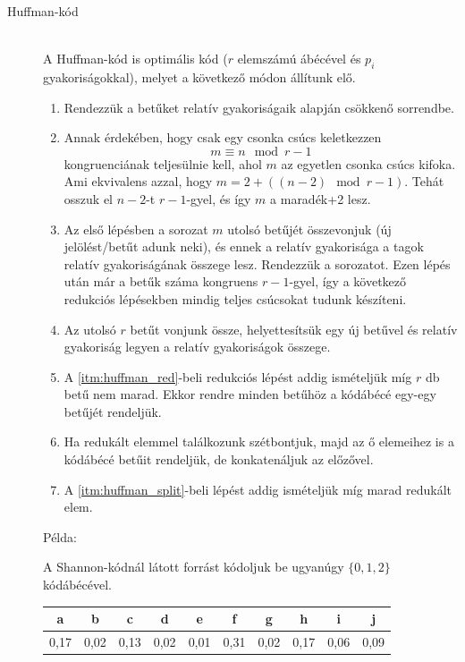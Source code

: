 \documentclass[margin=0px]{article}
\begin{document}
\begin{description}
    \item[Huffman-kód] \hfill \\
        A Huffman-kód is optimális kód ($r$ elemszámú ábécével és $p_i$ gyakoriságokkal), melyet a következő módon állítunk elő.
        \begin{enumerate}
            \item Rendezzük a betűket relatív gyakoriságaik alapján csökkenő sorrendbe.
            \item Annak érdekében, hogy csak egy csonka csúcs keletkezzen
                  \[m \equiv n \mod{r-1}\]
                  kongruenciának teljesülnie kell, ahol $m$ az egyetlen csonka csúcs kifoka. Ami ekvivalens azzal, hogy $m = 2 + ((n-2) \mod{r-1})$. Tehát osszuk el $n-2$-t $r-1$-gyel, és így $m$ a maradék+2 lesz.
            \item Az első lépésben a sorozat $m$ utolsó betűjét összevonjuk (új jelölést/betűt adunk neki), és ennek a relatív gyakorisága a tagok relatív gyakoriságának összege lesz. Rendezzük a sorozatot. Ezen lépés után már a betűk száma kongruens $r-1$-gyel, így a következő redukciós lépésekben mindig teljes csúcsokat tudunk készíteni.
            \item \label{itm:huffman_red} Az utolsó $r$ betűt vonjunk össze, helyettesítsük egy új betűvel és relatív gyakoriság legyen a relatív gyakoriságok összege.
            \item A \ref{itm:huffman_red}-beli redukciós lépést addig ismételjük míg $r$ db betű nem marad. Ekkor rendre minden betűhöz a kódábécé egy-egy betűjét rendeljük.
            \item \label{itm:huffman_split} Ha redukált elemmel találkozunk szétbontjuk, majd az ő elemeihez is a kódábécé betűit rendeljük, de konkatenáljuk az előzővel.
            \item A \ref{itm:huffman_split}-beli lépést addig ismételjük míg marad redukált elem.
        \end{enumerate}

        Példa:

        A Shannon-kódnál látott forrást kódoljuk be ugyanúgy $\{0,1,2\}$ kódábécével.

        \begin{tabular}{|c|c|c|c|c|c|c|c|c|c|}
            \hline a    & b    & c    & d    & e    & f    & g    & h    & i    & j    \\
            \hline 0,17 & 0,02 & 0,13 & 0,02 & 0,01 & 0,31 & 0,02 & 0,17 & 0,06 & 0,09 \\
            \hline
        \end{tabular}


\end{description}
\end{document}
